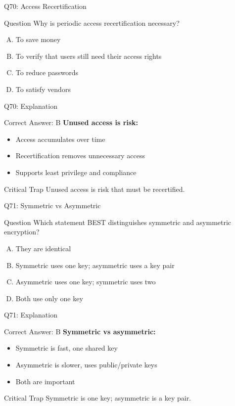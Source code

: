 \documentclass{beamer}
\begin{document}
	\begin{frame}{Q70: Access Recertification}
		\begin{block}{Question}
			Why is periodic access recertification necessary?
		\end{block}
		\begin{enumerate}[(A)]
			\item To save money
			\item To verify that users still need their access rights
			\item To reduce passwords
			\item To satisfy vendors
		\end{enumerate}
	\end{frame}
	
	\begin{frame}{Q70: Explanation}
		\begin{block}{Correct Answer: B}
			\textbf{Unused access is risk:}
			\begin{itemize}
				\item Access accumulates over time
				\item Recertification removes unnecessary access
				\item Supports least privilege and compliance
			\end{itemize}
		\end{block}
		\begin{alertblock}{Critical Trap}
			Unused access is risk that must be recertified.
		\end{alertblock}
	\end{frame}
	
	\begin{frame}{Q71: Symmetric vs Asymmetric}
		\begin{block}{Question}
			Which statement BEST distinguishes symmetric and asymmetric encryption?
		\end{block}
		\begin{enumerate}[(A)]
			\item They are identical
			\item Symmetric uses one key; asymmetric uses a key pair
			\item Asymmetric uses one key; symmetric uses two
			\item Both use only one key
		\end{enumerate}
	\end{frame}
	
	\begin{frame}{Q71: Explanation}
		\begin{block}{Correct Answer: B}
			\textbf{Symmetric vs asymmetric:}
			\begin{itemize}
				\item Symmetric is fast, one shared key
				\item Asymmetric is slower, uses public/private keys
				\item Both are important
			\end{itemize}
		\end{block}
		\begin{alertblock}{Critical Trap}
			Symmetric is one key; asymmetric is a key pair.
		\end{alertblock}
	\end{frame}
	
\end{document}
